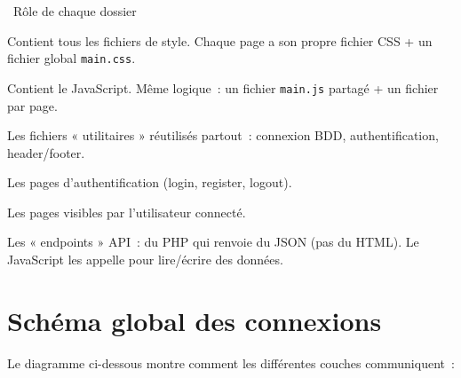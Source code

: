 \documentclass[12pt,a4paper]{article}
\begin{document}
\begin{conceptbox}{\faFolderOpen\ Rôle de chaque dossier}
\begin{description}[leftmargin=2.5cm, style=nextline]
    \item[\texttt{css/}] Contient tous les fichiers de style. Chaque page a son propre fichier CSS + un fichier global \texttt{main.css}.
    \item[\texttt{js/}] Contient le JavaScript. Même logique~: un fichier \texttt{main.js} partagé + un fichier par page.
    \item[\texttt{php/includes/}] Les fichiers « utilitaires » réutilisés partout~: connexion BDD, authentification, header/footer.
    \item[\texttt{php/auth/}] Les pages d'authentification (login, register, logout).
    \item[\texttt{php/pages/}] Les pages visibles par l'utilisateur connecté.
    \item[\texttt{php/api/}] Les « endpoints » API~: du PHP qui renvoie du JSON (pas du HTML). Le JavaScript les appelle pour lire/écrire des données.
\end{description}
\end{conceptbox}

\section{Schéma global des connexions}

Le diagramme ci-dessous montre comment les différentes couches communiquent~:
\end{document}
